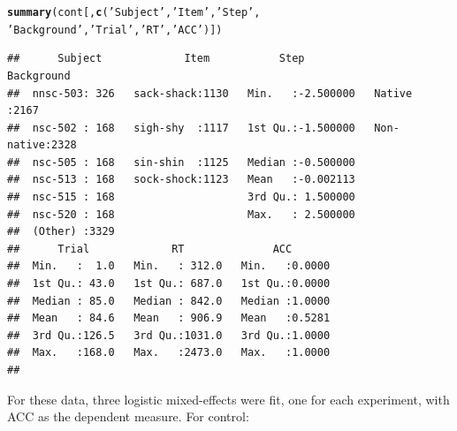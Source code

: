 \documentclass[11pt]{article}\usepackage[]{graphicx}\usepackage[]{color}
\makeatletter
\newcommand{\hlstr}[1]{\textcolor[rgb]{0.192,0.494,0.8}{#1}}%
\newcommand{\hlstd}[1]{\textcolor[rgb]{0.345,0.345,0.345}{#1}}%
\newcommand{\hlkwd}[1]{\textcolor[rgb]{0.737,0.353,0.396}{\textbf{#1}}}%
\newenvironment{kframe}{%
 \def\at@end@of@kframe{}%
 \ifinner\ifhmode%
  \def\at@end@of@kframe{\end{minipage}}%
  \begin{minipage}{\columnwidth}%
 \fi\fi%
 \def\FrameCommand##1{\hskip\@totalleftmargin \hskip-\fboxsep
 \colorbox{shadecolor}{##1}\hskip-\fboxsep
     \hskip-\linewidth \hskip-\@totalleftmargin \hskip\columnwidth}%
 \MakeFramed {\advance\hsize-\width
   \@totalleftmargin\z@ \linewidth\hsize
   \@setminipage}}%
 {\par\unskip\endMakeFramed%
 \at@end@of@kframe}
\newenvironment{knitrout}{}{} %
\makeatother
\begin{document}
\begin{knitrout}\footnotesize
{}\color{fgcolor}\begin{kframe}
\begin{alltt}
 \hlkwd{summary}\hlstd{(cont[,}\hlkwd{c}\hlstd{(}\hlstr{'Subject'}\hlstd{,} \hlstr{'Item'}\hlstd{,} \hlstr{'Step'}\hlstd{,}
 \hlstr{'Background'}\hlstd{,} \hlstr{'Trial'}\hlstd{,} \hlstr{'RT'}\hlstd{,} \hlstr{'ACC'}\hlstd{)])}
\end{alltt}
\begin{verbatim}
##      Subject             Item           Step                Background  
##  nnsc-503: 326   sack-shack:1130   Min.   :-2.500000   Native    :2167  
##  nsc-502 : 168   sigh-shy  :1117   1st Qu.:-1.500000   Non-native:2328  
##  nsc-505 : 168   sin-shin  :1125   Median :-0.500000                    
##  nsc-513 : 168   sock-shock:1123   Mean   :-0.002113                    
##  nsc-515 : 168                     3rd Qu.: 1.500000                    
##  nsc-520 : 168                     Max.   : 2.500000                    
##  (Other) :3329                                                          
##      Trial             RT              ACC        
##  Min.   :  1.0   Min.   : 312.0   Min.   :0.0000  
##  1st Qu.: 43.0   1st Qu.: 687.0   1st Qu.:0.0000  
##  Median : 85.0   Median : 842.0   Median :1.0000  
##  Mean   : 84.6   Mean   : 906.9   Mean   :0.5281  
##  3rd Qu.:126.5   3rd Qu.:1031.0   3rd Qu.:1.0000  
##  Max.   :168.0   Max.   :2473.0   Max.   :1.0000  
## 
\end{verbatim}
\end{kframe}
\end{knitrout}

For these data, three logistic mixed-effects were fit, one for each experiment, with ACC as the dependent measure.  For control:
\end{document}
